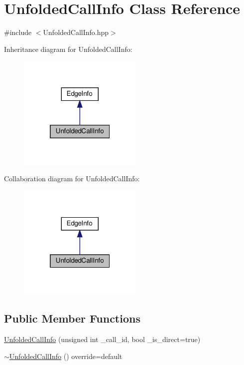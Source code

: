 \hypertarget{classUnfoldedCallInfo}{}\section{Unfolded\+Call\+Info Class Reference}
\label{classUnfoldedCallInfo}


{\ttfamily \#include $<$Unfolded\+Call\+Info.\+hpp$>$}



Inheritance diagram for Unfolded\+Call\+Info\+:
\nopagebreak
\begin{figure}[H]
\begin{center}
\leavevmode
\includegraphics[width=169pt]{d1/d41/classUnfoldedCallInfo__inherit__graph}
\end{center}
\end{figure}


Collaboration diagram for Unfolded\+Call\+Info\+:
\nopagebreak
\begin{figure}[H]
\begin{center}
\leavevmode
\includegraphics[width=169pt]{d3/dad/classUnfoldedCallInfo__coll__graph}
\end{center}
\end{figure}
\subsection*{Public Member Functions}
\begin{DoxyCompactItemize}
\item 
\hyperlink{classUnfoldedCallInfo_a5e84b77ffbd321375bd25ea34b65cdba}{Unfolded\+Call\+Info} (unsigned int \+\_\+call\+\_\+id, bool \+\_\+is\+\_\+direct=true)
\item 
\hyperlink{classUnfoldedCallInfo_a3d2273e0c9f0ecffa4c157c82ba45d98}{$\sim$\+Unfolded\+Call\+Info} () override=default
\end{DoxyCompactItemize}
